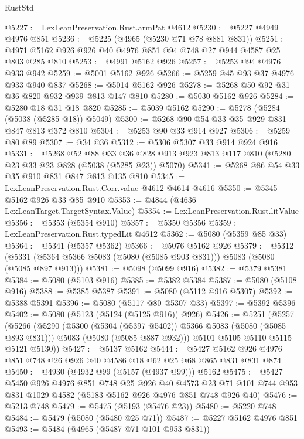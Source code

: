 \begin{lexlean}{RustStd}
\begin{coremodule}
{\begin{coremodule}
{{{{{@5227 := LexLeanPreservation.Rust.armPat @4612
@5230 := @5227 @4949 @4976 @851
@5236 := @5225 (@4965 (@5230 @71 @78 @881 @831))
@5251 := @4971 @5162 @926 @926 @40 @4976 @851 @94 @748 @27 @944 @4587 @25 @803 @285 @810
@5253 := @4991 @5162 @926
@5257 := @5253 @94 @4976 @933 @942
@5259 := @5001 @5162 @926
@5266 := @5259 @45 @93 @37 @4976 @933 @940 @837
@5268 := @5014 @5162 @926
@5278 := @5268 @50 @92 @31 @36 @820 @932 @939 @813 @147 @810
@5280 := @5030 @5162 @926
@5284 := @5280 @18 @31 @18 @820
@5285 := @5039 @5162
@5290 := @5278 (@5284 (@5038 (@5285 @18)) @5049)
@5300 := @5268 @90 @54 @33 @35 @929 @831 @847 @813 @372 @810
@5304 := @5253 @90 @33 @914 @927
@5306 := @5259 @80 @89
@5307 := @34 @36
@5312 := @5306 @5307 @33 @914 @924 @916
@5331 := @5268
    @52
    @88
    @33
    @36
    @828
    @913
    @923
    @813
    @117
    @810
    (@5280 @23 @33 @23 @828 (@5038 (@5285 @23)) @5070)
@5341 := @5268 @86 @54 @33 @35 @910 @831 @847 @813 @135 @810
@5345 := LexLeanPreservation.Rust.Corr.value @4612 @4614 @4616
@5350 := @5345 @5162 @926 @33 @85 @910
@5353 := @4844 (@4636 LexLeanTarget.TargetSyntax.Value)
@5354 := LexLeanPreservation.Rust.litValue
@5356 := @5353 (@5354 @910)
@5357 := @5350 @5356
@5359 := LexLeanPreservation.Rust.typedLit @4612
@5362 := @5080 (@5359 @85 @33)
@5364 := @5341 (@5357 @5362)
@5366 := @5076 @5162 @926
@5379 := @5312 (@5331 (@5364 @5366 @5083 (@5080 (@5085 @903 @831))) @5083 (@5080 (@5085 @897 @913)))
@5381 := @5098 (@5099 @916)
@5382 := @5379 @5381
@5384 := @5080 (@5103 @916)
@5385 := @5382 @5384
@5387 := @5080 (@5108 @916)
@5388 := @5385 @5387
@5391 := @5080 (@5112 @916 @5307)
@5392 := @5388 @5391
@5396 := @5080 (@5117 @80 @5307 @33)
@5397 := @5392 @5396
@5402 := @5080 (@5123 (@5124 (@5125 @916)) @926)
@5426 := @5251
    (@5257
      (@5266
        (@5290
          (@5300 (@5304 (@5397 @5402)) @5366 @5083 (@5080 (@5085 @893 @831)))
          @5083
          (@5080 (@5085 @887 @932)))
        @5101
        @5105
        @5110
        @5115
        @5121
        @5130))
@5427 := @5137 @5162
@5444 := @5427 @5162 @926 @4976 @851 @748 @26 @926 @40 @4586 @18 @62 @25 @68 @865 @831 @831 @874
@5450 := @4930 (@4932 @99 (@5157 (@4937 @99))) @5162
@5475 := @5427
    @5450
    @926
    @4976
    @851
    @748
    @25
    @926
    @40
    @4573
    @23
    @71
    @101
    @744
    @953
    @831
    @1029
    @4582
    (@5183 @5162 @926 @4976 @851 @748 @926 @40)
@5476 := @5213 @748
@5479 := @5475 (@5193 (@5476 @23))
@5480 := @5220 @748
@5484 := @5479 (@5080 (@5480 @25 @71))
@5487 := @5227 @5162 @4976 @851
@5493 := @5484 (@4965 (@5487 @71 @101 @953 @831))
}}}}}
\end{coremodule}}
\end{coremodule}
\end{lexlean}
